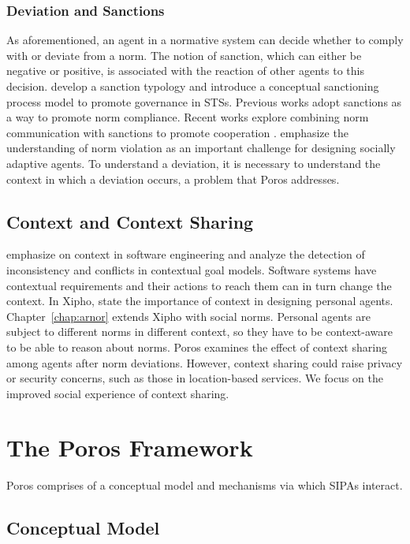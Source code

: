 \documentclass[11pt,          %
               phd,           %
               onehalfspacing %
               ]{ncsuthesis}
\newcommand{\frameworkB}{Poros\xspace}
\begin{document}
\subsubsection{Deviation and Sanctions}
As aforementioned, an agent in a normative system can decide whether to
comply with or deviate from a norm. The notion of sanction, which can
either be negative or positive, is associated with the reaction of other
agents to this decision. \citet{Nardin-KER16-Classifying}
develop a sanction typology and introduce a conceptual sanctioning
process model to promote governance in STSs. Previous works adopt
sanctions as a way to promote norm compliance. Recent works explore
combining norm communication with sanctions to promote cooperation
\citep{Andrighetto-2013-PunishVoice}. 
 emphasize the understanding of norm
violation as an important challenge for designing socially adaptive
agents. To understand a deviation, it is necessary to understand the
context in which a deviation occurs, a problem that \frameworkB
addresses.

\subsection{Context and Context Sharing}
\citet{Ali-2013-Reasoning} emphasize on context in software
engineering and analyze the detection of inconsistency and conflicts in
contextual goal models. Software systems have contextual requirements
and their actions to reach them can in turn change the context. In
Xipho, \citet{Murukannaiah-AAMAS14-Xipho} state the
importance of context in designing personal agents. 
Chapter~\ref{chap:arnor} extends Xipho with social norms. Personal
agents are subject to different norms in different context, so they have
to be context-aware to be able to reason about norms. \frameworkB
examines the effect of context sharing among agents after norm
deviations. However, context sharing could raise privacy or security
concerns, such as those in location-based services. We focus on the
improved social experience of context sharing.

\section{The \frameworkB Framework}
\label{sec:precious-framework}

\frameworkB comprises of a conceptual model and mechanisms via which
SIPAs interact. 

\subsection{Conceptual Model}
\end{document}
